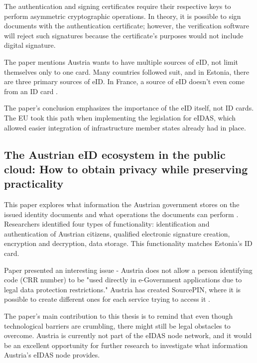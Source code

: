 The authentication and signing certificates require their respective keys to perform asymmetric cryptographic operations. In theory, it is possible to sign documents with the authentication certificate; however, the verification software will reject such signatures because the certificate's purposes would not include digital signature.


The paper mentions Austria wants to have multiple sources of eID, not limit themselves only to one card. Many countries followed suit, and in Estonia, there are three primary sources of eID. In France, a source of eID doesn't even come from an ID card \cite{eidas-notify-france}.

The paper's conclusion emphasizes the importance of the eID itself, not ID cards. The EU took this path when implementing the legislation for eIDAS, which allowed easier integration of infrastructure member states already had in place.

\subsection{The Austrian eID ecosystem in the public cloud: How to obtain privacy while preserving practicality}

This paper explores what information the Austrian government stores on the issued identity documents and what operations the documents can perform \cite{ZWATTENDORFER201635}. Researchers identified four types of functionality: identification and authentication of Austrian citizens, qualified electronic signature creation, encryption and decryption, data storage. This functionality matches Estonia's ID card.

Paper presented an interesting issue - Austria does not allow a person identifying code (CRR number) to be "used directly in e-Government applications due to legal data protection restrictions." Austria has created SourcePIN, where it is possible to create different ones for each service trying to access it \cite{ZWATTENDORFER201635,austria-eid-presentation}.

The paper's main contribution to this thesis is to remind that even though technological barriers are crumbling, there might still be legal obstacles to overcome. Austria is currently not part of the eIDAS node network, and it would be an excellent opportunity for further research to investigate what information Austria's eIDAS node provides.

